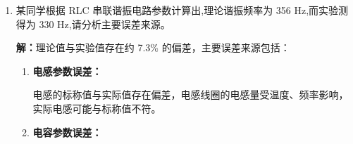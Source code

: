 \documentclass[12pt,a4paper]{article}
\begin{document}
\begin{enumerate}
    \textbf{解：}可采用以下几种实验方法：
    
    \begin{enumerate}[label=(\arabic*)]
        \item \textbf{电流最大法：}
        
        调节信号源频率，观察电路电流，当电流达到最大值时，电路达到谐振状态。这是最直接、最常用的方法。
        
        \item \textbf{相位法：}
        
        使用双踪示波器同时观察电源电压 $u_s(t)$ 和电流 $i(t)$（或电阻两端电压 $u_R(t)$）的波形。当两波形同相位（相位差为零）时，电路达到谐振。
        
        \item \textbf{电压法：}
        
        测量电容或电感两端的电压，当其达到最大值时（$u_C = u_L = Q \cdot u_s$），电路谐振。
        
        \item \textbf{阻抗最小法：}
        
        测量电路总阻抗 $Z$，当阻抗最小（$Z = R$）时，电路谐振。
        
        \item \textbf{功率因数法：}
        
        测量功率因数 $\cos\phi$，当功率因数为 1（即 $\phi = 0$）时，电路达到谐振。
        
        \item \textbf{频率扫描法：}
        
        使用频率扫描功能，绘制幅频特性曲线，曲线峰值对应的频率即为谐振频率。
    \end{enumerate}

    \item 某同学根据 RLC 串联谐振电路参数计算出,理论谐振频率为 356 Hz,而实验测得为 330 Hz,请分析主要误差来源。
    
    \textbf{解：}理论值与实验值存在约 7.3\% 的偏差，主要误差来源包括：
    
    \begin{enumerate}[label=(\arabic*)]
        \item \textbf{电感参数误差：}
        
        电感的标称值与实际值存在偏差，电感线圈的电感量受温度、频率影响，实际电感可能与标称值不符。
        
        \item \textbf{电容参数误差：}
        

\end{enumerate}
\end{enumerate}
\end{document}
